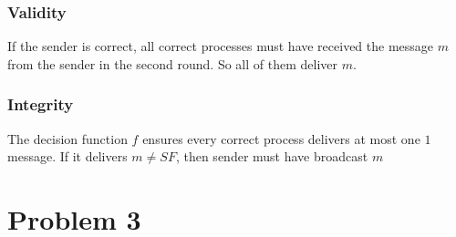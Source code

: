 \documentclass[12pt]{article}
\begin{document}
\subsubsection*{Validity}
If the sender is correct, all correct processes must have received the message $m$ from the sender in the second round. So all of them deliver $m$.
\subsubsection*{Integrity}
The decision function $f$ ensures every correct process delivers at most one $1$ message. If it delivers $m\neq SF$, then sender must have broadcast $m$

\section*{Problem 3}
\end{document}
